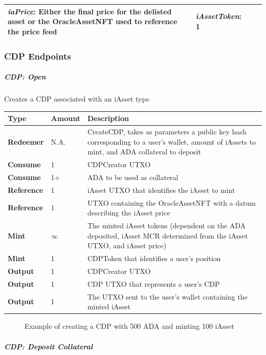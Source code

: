 \documentclass{article}
\begin{document}
\begin{sloppypar}
\begin{tabularx}{\linewidth}{l|L|L|L}
\emph{iaPrice}: Either the final price for the delisted asset or the
OracleAssetNFT used to reference the price feed
&
\emph{iAssetToken}: 1
\tabularnewline
\bottomrule
\end{tabularx}

\hypertarget{cdp-endpoints}{%
\subsubsection{CDP Endpoints}\label{cdp-endpoints}}

\hypertarget{cdp-open}{%
\subparagraph{CDP: Open}\label{cdp-open}}

Creates a CDP associated with an iAsset type

\begin{tabularx}{\linewidth}{l|l|L}
\toprule
\textbf{Type} & \textbf{Amount} & \textbf{Description}
\tabularnewline
\midrule
\endhead
\textbf{Redeemer} & N.A. & CreateCDP, takes as parameters a public key
hash corresponding to a user's wallet, amount of iAssets to mint, and
ADA collateral to deposit
\tabularnewline
\midrule
\textbf{Consume} & 1 & CDPCreator UTXO
\tabularnewline
\midrule
\textbf{Consume} & 1+ & ADA to be used as collateral
\tabularnewline
\midrule
\textbf{Reference} & 1 & iAsset UTXO that identifies the iAsset to
mint
\tabularnewline
\midrule
\textbf{Reference} & 1 & UTXO containing the OracleAssetNFT with a datum
describing the iAsset price
\tabularnewline
\midrule
\textbf{Mint} & \(\infty\) & The minted iAsset tokens (dependent on the
ADA deposited, iAsset MCR determined from the iAsset UTXO, and iAsset
price)
\tabularnewline
\midrule
\textbf{Mint} & 1 & CDPToken that identifies a user's
position
\tabularnewline
\midrule
\textbf{Output} & 1 & CDPCreator UTXO
\tabularnewline
\midrule
\textbf{Output} & 1 & CDP UTXO that represents a user's
CDP
\tabularnewline
\midrule
\textbf{Output} & 1 & The UTXO sent to the user's wallet containing the
minted iAsset
\tabularnewline
\bottomrule
\end{tabularx}

\hypertarget{cdp-open-figure}{%
\begin{figure}[htbp]
\centering

\caption{Example of creating a CDP with 500 ADA and minting 100 iAsset}
\label{cdp-open-figure}
\end{figure}}

\hypertarget{cdp-deposit-collateral}{%
\subparagraph{CDP: Deposit Collateral}\label{cdp-deposit-collateral}}


\end{sloppypar}
\end{document}
